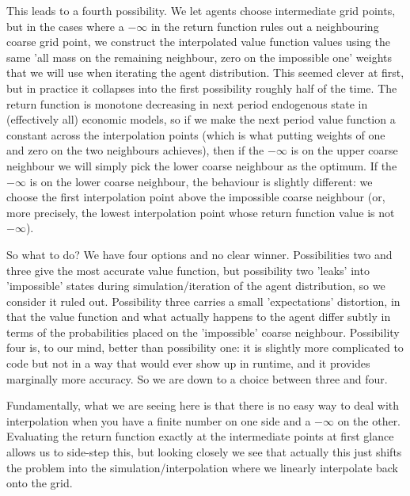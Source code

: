 \documentclass[11pt,fleqn]{article}
\begin{document}
This leads to a fourth possibility. We let agents choose intermediate grid points, but in the cases where a $-\infty$ in the return function rules out a neighbouring coarse grid point, we construct the interpolated value function values using the same 'all mass on the remaining neighbour, zero on the impossible one' weights that we will use when iterating the agent distribution. This seemed clever at first, but in practice it collapses into the first possibility roughly half of the time. The return function is monotone decreasing in next period endogenous state in (effectively all) economic models, so if we make the next period value function a constant across the interpolation points (which is what putting weights of one and zero on the two neighbours achieves), then if the $-\infty$ is on the upper coarse neighbour we will simply pick the lower coarse neighbour as the optimum. If the $-\infty$ is on the lower coarse neighbour, the behaviour is slightly different: we choose the first interpolation point above the impossible coarse neighbour (or, more precisely, the lowest interpolation point whose return function value is not $-\infty$).

So what to do? We have four options and no clear winner. Possibilities two and three give the most accurate value function, but possibility two 'leaks' into 'impossible' states during simulation/iteration of the agent distribution, so we consider it ruled out. Possibility three carries a small 'expectations' distortion, in that the value function and what actually happens to the agent differ subtly in terms of the probabilities placed on the 'impossible' coarse neighbour. Possibility four is, to our mind, better than possibility one: it is slightly more complicated to code but not in a way that would ever show up in runtime, and it provides marginally more accuracy. So we are down to a choice between three and four.

Fundamentally, what we are seeing here is that there is no easy way to deal with interpolation when you have a finite number on one side and a $-\infty$ on the other. Evaluating the return function exactly at the intermediate points at first glance allows us to side-step this, but looking closely we see that actually this just shifts the problem into the simulation/interpolation where we linearly interpolate back onto the grid.
\end{document}
